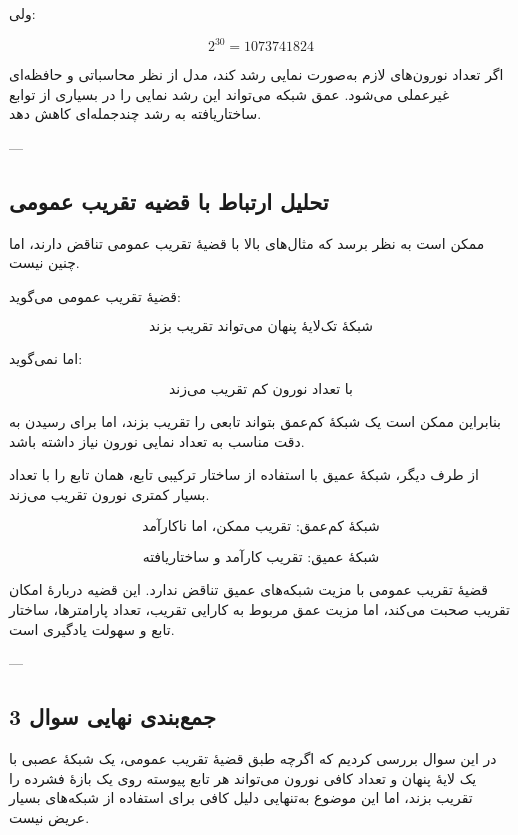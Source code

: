 \documentclass[12pt,a4paper]{article}
\begin{document}
ولی:

\[
2^{30}=1073741824
\]

\begin{tcolorbox}[
	colback=softpink,
	colframe=softred,
	title=اهمیت تفاوت رشدها
	]
	اگر تعداد نورون‌های لازم به‌صورت نمایی رشد کند، مدل از نظر محاسباتی و حافظه‌ای غیرعملی می‌شود. عمق شبکه می‌تواند این رشد نمایی را در بسیاری از توابع ساختاریافته به رشد چندجمله‌ای کاهش دهد.
\end{tcolorbox}

---

\subsection{تحلیل ارتباط با قضیه تقریب عمومی}

ممکن است به نظر برسد که مثال‌های بالا با قضیهٔ تقریب عمومی تناقض دارند، اما چنین نیست.

قضیهٔ تقریب عمومی می‌گوید:

\[
\text{شبکهٔ تک‌لایهٔ پنهان می‌تواند تقریب بزند}
\]

اما نمی‌گوید:

\[
\text{با تعداد نورون کم تقریب می‌زند}
\]

بنابراین ممکن است یک شبکهٔ کم‌عمق بتواند تابعی را تقریب بزند، اما برای رسیدن به دقت مناسب به تعداد نمایی نورون نیاز داشته باشد.

از طرف دیگر، شبکهٔ عمیق با استفاده از ساختار ترکیبی تابع، همان تابع را با تعداد بسیار کمتری نورون تقریب می‌زند.

\[
\text{شبکهٔ کم‌عمق: تقریب ممکن، اما ناکارآمد}
\]

\[
\text{شبکهٔ عمیق: تقریب کارآمد و ساختاریافته}
\]

\begin{tcolorbox}[
	colback=lightblue,
	colframe=mainblue,
	title=رفع ابهام مهم
	]
	قضیهٔ تقریب عمومی با مزیت شبکه‌های عمیق تناقض ندارد. این قضیه دربارهٔ امکان تقریب صحبت می‌کند، اما مزیت عمق مربوط به کارایی تقریب، تعداد پارامترها، ساختار تابع و سهولت یادگیری است.
\end{tcolorbox}

---

\subsection{جمع‌بندی نهایی سوال 3}

در این سوال بررسی کردیم که اگرچه طبق قضیهٔ تقریب عمومی، یک شبکهٔ عصبی با یک لایهٔ پنهان و تعداد کافی نورون می‌تواند هر تابع پیوسته روی یک بازهٔ فشرده را تقریب بزند، اما این موضوع به‌تنهایی دلیل کافی برای استفاده از شبکه‌های بسیار عریض نیست.
\end{document}
